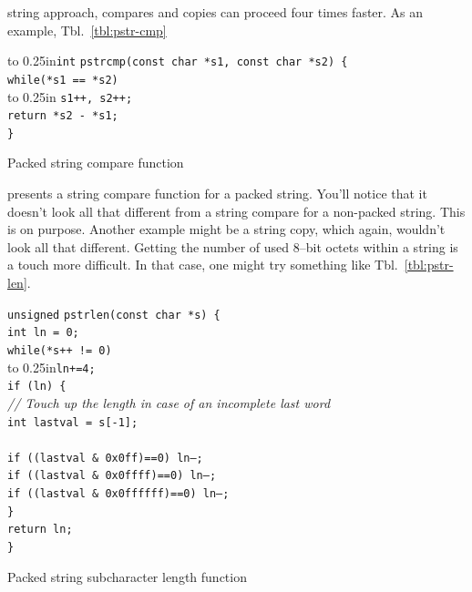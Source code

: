 \documentclass{gqtekspec}
\begin{document}
string approach, compares and copies can proceed four times faster.  As an
example, Tbl.~\ref{tbl:pstr-cmp}
\begin{table}\begin{center}
\begin{tabbing}
\hbox to 0.25in{\tt int} \= {\tt pstrcmp(const char *s1, const char *s2) \{} \\
	\> {\tt while(*s1 == *s2)} \\
	\> \hbox to 0.25in{} {\tt s1++, s2++;} \\
	\> {\tt return *s2 - *s1;} \\
{\tt \}}
\end{tabbing}
\caption{Packed string compare function}\label{tbl:pstr-cmp}
\end{center}\end{table}
presents a string compare function for a packed string.  You'll notice that
it doesn't look all that different from a string compare for a non-packed
string.  This is on purpose.  Another example might be a string copy, which
again, wouldn't look all that different.  Getting the number of used 8--bit
octets within a string is a touch more difficult.  In that case, one might
try something like Tbl.~\ref{tbl:pstr-len}.
\begin{table}\begin{center}
\begin{tabbing}
{\tt unsigned} \= {\tt pstrlen(const char *s) \{} \\
	\> {\tt int ln = 0;} \\
	\> {\tt while(*s++ != 0)} \\
	\> \hbox to 0.25in{}\={\tt ln+=4;} \\
	\> {\tt if (ln) \{}\\
	\>\>	{\em // Touch up the length in case of an incomplete last word} \\
	\>\>	{\tt int lastval = s[-1];}\\
\\
	\>\>	{\tt if ((lastval \& 0x0ff)==0) ln--;}\\
	\>\>	{\tt if ((lastval \& 0x0ffff)==0) ln--;}\\
	\>\>	{\tt if ((lastval \& 0x0ffffff)==0) ln--;}\\
	\> {\tt \}} \\
	\> {\tt return ln;} \\
{\tt \}}
\end{tabbing}
\caption{Packed string subcharacter length function}\label{tbl:pstr-len}
\end{center}\end{table}
\end{document}
